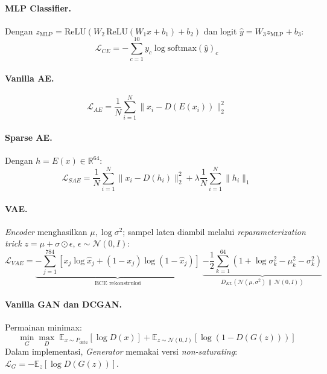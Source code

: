 \documentclass{article}
\begin{document}
\paragraph{MLP Classifier.} Dengan $z_{\text{MLP}} = \mathrm{ReLU}(W_2\,\mathrm{ReLU}(W_1 x + b_1) + b_2)$ dan logit $\hat{y} = W_3 z_{\text{MLP}} + b_3$:
\begin{equation}
    \mathcal{L}_{CE} = -\sum_{c=1}^{10} y_c \log \mathrm{softmax}(\hat{y})_c
\end{equation}

\paragraph{Vanilla AE.}
\begin{equation}
    \mathcal{L}_{AE} = \frac{1}{N}\sum_{i=1}^{N} \lVert x_i - D(E(x_i)) \rVert_2^2
\end{equation}

\paragraph{Sparse AE.} Dengan $h = E(x) \in \mathbb{R}^{64}$:
\begin{equation}
    \mathcal{L}_{SAE} = \frac{1}{N}\sum_{i=1}^{N} \lVert x_i - D(h_i) \rVert_2^2 + \lambda \frac{1}{N}\sum_{i=1}^{N} \lVert h_i \rVert_1
\end{equation}

\paragraph{VAE.} \textit{Encoder} menghasilkan $\mu, \log\sigma^2$; sampel laten diambil melalui \textit{reparameterization trick} $z = \mu + \sigma \odot \epsilon$, $\epsilon \sim \mathcal{N}(0, I)$:
\begin{equation}
    \mathcal{L}_{VAE} = \underbrace{-\sum_{j=1}^{784}\left[x_j \log \hat{x}_j + (1-x_j)\log(1-\hat{x}_j)\right]}_{\text{BCE rekonstruksi}}
    \; \underbrace{- \frac{1}{2}\sum_{k=1}^{64}\left(1 + \log\sigma_k^2 - \mu_k^2 - \sigma_k^2\right)}_{D_{KL}(\mathcal{N}(\mu,\sigma^2)\,\|\,\mathcal{N}(0,I))}
\end{equation}

\paragraph{Vanilla GAN dan DCGAN.} Permainan minimax:
\begin{equation}
    \min_G \max_D \; \mathbb{E}_{x \sim P_{data}}[\log D(x)] + \mathbb{E}_{z \sim \mathcal{N}(0,I)}[\log(1 - D(G(z)))]
\end{equation}
Dalam implementasi, \textit{Generator} memakai versi \textit{non-saturating}: $\mathcal{L}_G = -\mathbb{E}_z[\log D(G(z))]$.
\end{document}
